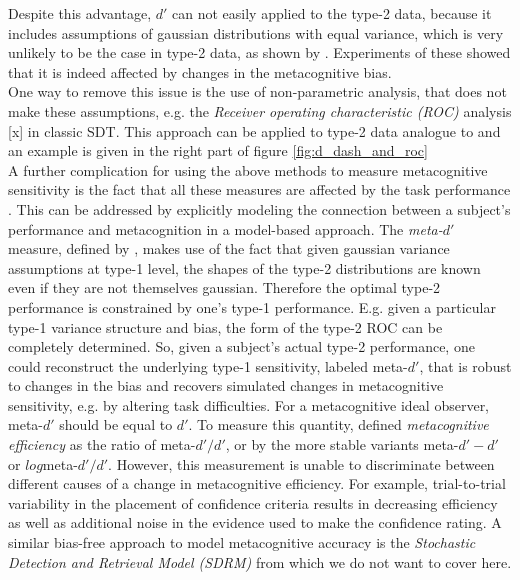 \documentclass[../main/main.tex]{subfiles}
\begin{document}
	Despite this advantage, $d'$ can not easily applied to the type-2 data, because it includes assumptions of gaussian distributions with equal variance, which is very unlikely to be the case in type-2 data, as shown by \cite{galvin2003type}. Experiments of these \cite{azzopardi2007evaluation} showed that it is indeed affected by changes in the metacognitive bias.\\
	One way to remove this issue is the use of non-parametric analysis, that does not make these assumptions, e.g. the \textit{Receiver operating characteristic (ROC)} analysis [x] in classic SDT. This approach can be applied to type-2 data analogue to \cite{clarke1959two} and an example is given in the right part of figure \ref{fig:d_dash_and_roc}\\
	A further complication for using the above methods to measure metacognitive sensitivity is the fact that all these measures are affected by the task performance \cite{galvin2003type}. This can be addressed by explicitly modeling the connection between a subject's performance and metacognition in a model-based approach. The \textit{meta-$d'$} measure, defined by \cite{maniscalco2012signal}, makes use of the fact that given gaussian variance assumptions at type-1 level, the shapes of the type-2 distributions are known even if they are not themselves gaussian. Therefore the optimal type-2 performance is constrained by one's type-1 performance. E.g. given a particular type-1 variance structure and bias, the form of the type-2 ROC can be completely determined. So, given a subject's actual type-2 performance, one could reconstruct the underlying type-1 sensitivity, labeled meta-$d'$, that is robust to changes in the bias and recovers simulated changes in metacognitive sensitivity, e.g. by altering task difficulties. For a metacognitive ideal observer, meta-$d'$ should be equal to $d'$. To measure this quantity, \cite{fleming2014measure} defined \textit{metacognitive efficiency} as the ratio of meta-$d'/d'$, or by the more stable variants meta-$d'-d'$ or $log$meta-$d'/d'$. However, this measurement is unable to discriminate between different causes of a change in metacognitive efficiency. For example,  trial-to-trial variability in the placement of confidence criteria results in decreasing efficiency as well as additional noise in the evidence used to make the confidence rating. A similar bias-free approach to model metacognitive accuracy is the \textit{Stochastic Detection and Retrieval Model (SDRM)} from \cite{jang2012stochastic} which we do not want to cover here.\\
\end{document}
